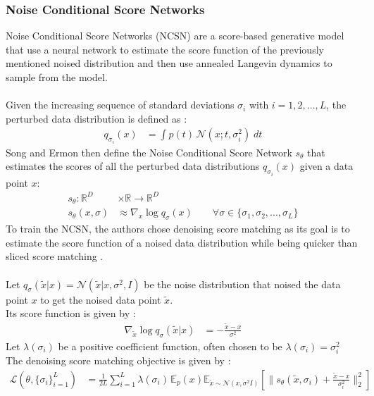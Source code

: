 \documentclass{article}
\begin{document}
\subsubsection{Noise Conditional Score Networks}
Noise Conditional Score Networks (NCSN) are a score-based generative model that use a neural network to estimate the score function of the previously mentioned noised distribution and then use annealed Langevin dynamics to sample from the model. \cite{song2020generative}
\\\\
Given the increasing sequence of standard deviations $\sigma_i$ with $i = 1, 2, ..., L$, the perturbed data distribution is defined as \cite{song2020generative}:
\begin{align}
  q_{\sigma_i}(x) &= \int p(t) \, \mathcal{N}(x; t, \sigma_i^2) \; dt
\end{align}
Song and Ermon \cite{song2020generative} then define the Noise Conditional Score Network $s_\theta$ that estimates the scores of all the perturbed data distributions $q_{\sigma_i}(x)$ given a data point $x$:
\begin{align}
  s_\theta : \mathbb{R}^D &\times \mathbb{R} \rightarrow \mathbb{R}^D \\
  s_\theta (x, \sigma) &\approx \nabla_x \log q_\sigma (x) \qquad \forall \sigma \in \{ \sigma_1, \sigma_2, ..., \sigma_L \}
\end{align}
To train the NCSN, the authors chose denoising score matching \cite{vincent2010denoising} as its goal is to estimate the score function of a noised data distribution while being quicker than sliced score matching \cite{song2019sliced}. \cite{song2020generative}
\\\\
Let $q_\sigma (\tilde{x} | x) = \mathcal{N}(\tilde{x} | x, \sigma^2, I)$ be the noise distribution that noised the data point $x$ to get the noised data point $\tilde{x}$. \\
Its score function is given by \cite{song2020generative}:
\begin{align}
  \nabla_{\tilde{x}} \log q_\sigma (\tilde{x} | x) &= - \frac{\tilde{x} - x}{\sigma^2} 
\end{align}
Let $\lambda (\sigma_i)$ be a positive coefficient function, often chosen to be $\lambda (\sigma_i) = \sigma_i^2$ \cite{songblog, song2020generative} \\
The denoising score matching objective is given by \cite{song2020generative}:
\begin{align}
  \mathcal{L}(\theta, \{ \sigma_i \}_{i=1}^L) &= \frac{1}{2L} \sum^L_{i=1} \lambda(\sigma_i) \, \mathbb{E}_p(x) \mathbb{E}_{\tilde{x} \sim \mathcal{N}(x, \sigma^2 I)} \left[ \| s_\theta (\tilde{x}, \sigma_i) + \frac{\tilde{x} - x}{\sigma_i^2} \|_2^2 \right]
\end{align}
\end{document}
